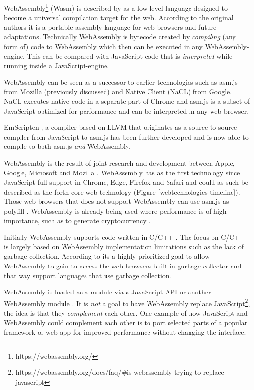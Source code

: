 WebAssembly\footnote{https://webassembly.org/} (Wasm) is described by \textcite{Watt2018,JangdaPowersGuhaBerger2019} as a low-level language designed to become a universal compilation target for the web. According to the original authors \textcite{HaasRossbergSchuffTitzerHolmanGohmanWagnerZakaiBastien2017} it is a portable assembly-language for web browsers and future adaptations. Technically WebAssembly is bytecode created by \emph{compiling} (any form of) code to WebAssembly \parencite{Watt2018} which then can be executed in any WebAssembly-engine. This can be compared with JavaScript-code that is \emph{interpreted} while running inside a JavaScript-engine.

WebAssembly can be seen as a successor to earlier technologies such as asm.js from Mozilla (previously discussed) and Native Client (NaCL) from Google. NaCL executes native code in a separate part of Chrome and asm.js  \parencite{Zakai2018} is a subset of JavaScript optimized for performance \parencite{VanEsNicolayStievenartDHondtDeRoover2016} and can be interpreted in any web browser.

EmScripten \parencite{Zakai2011}, a compiler based on LLVM \parencite{LattnerAdve2014} that originates as a source-to-source compiler from JavaScript to asm.js \parencite{Zakai2011} has been further developed \parencite{HaasRossbergSchuffTitzerHolmanGohmanWagnerZakaiBastien2017} and is now able to compile to both asm.js \emph{and} WebAssembly.

WebAssembly is the result of joint research and development between Apple, Google, Microsoft and Mozilla \parencite{HaasRossbergSchuffTitzerHolmanGohmanWagnerZakaiBastien2017}. WebAssembly has as the first technology since JavaScript full support in Chrome, Edge, Firefox and Safari and could as such be described as the forth core web technology (Figure \ref{webtechnologies-timeline}). Those web browsers that does not support WebAssembly can use asm.js as polyfill \parencite{HaasRossbergSchuffTitzerHolmanGohmanWagnerZakaiBastien2017}. WebAssembly is already being used where performance is of high importance, such as to generate cryptocurrency \parencite{RuthZimmermannWolsingHohlfeld2018}.

Initially WebAssembly supports code written in C/C++ \parencite{HaasRossbergSchuffTitzerHolmanGohmanWagnerZakaiBastien2017}. 
The focus on C/C++ is largely based on WebAssembly implementation limitations such as the lack of garbage collection. According to \textcite{HaasRossbergSchuffTitzerHolmanGohmanWagnerZakaiBastien2017} its a highly prioritized goal to allow WebAssembly to gain to access the web browsers built in garbage collector and that way support languages that use garbage collection.

WebAssembly is loaded as a module via a JavaScript API or another WebAssembly module \parencite{HaasRossbergSchuffTitzerHolmanGohmanWagnerZakaiBastien2017}. It is \emph{not} a goal to have WebAssembly replace JavaScript\footnote{https://webassembly.org/docs/faq/\#is-webassembly-trying-to-replace-javascript}, the idea is that they \emph{complement} each other. One example of how JavaScript and WebAssembly could complement each other is to port selected parts of a popular framework or web app for improved performance without changing the interface.
